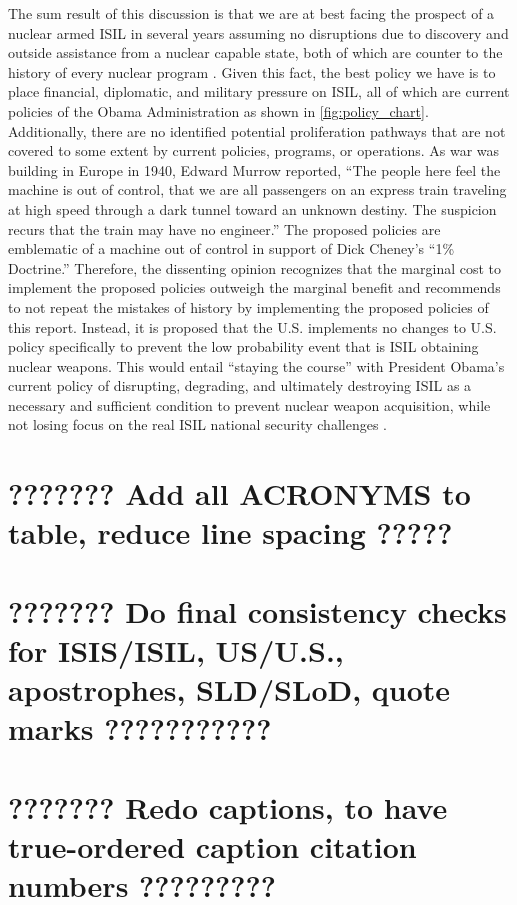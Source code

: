 \documentclass{report}
\begin{document}
The sum result of this discussion is that we are at best facing the prospect of a nuclear armed ISIL in several years assuming no disruptions due to discovery and outside assistance from a nuclear capable state, both of which are counter to the history of every nuclear program \cite{pollack2014unthinkable,Reed2010}.  Given this fact, the best policy we have is to place financial, diplomatic, and military pressure on ISIL, all of which are current policies of the Obama Administration as shown in \autoref{fig:policy_chart}.  Additionally, there are no identified potential proliferation pathways that are not covered to some extent by current policies, programs, or operations.  As war was building in Europe in 1940, Edward Murrow reported, \enquote{The people here feel the machine is out of control, that we are all passengers on an express train traveling at high speed through a dark tunnel toward an unknown destiny.  The suspicion recurs that the train may have no engineer.}  The proposed policies are emblematic of a machine out of control in support of Dick Cheney's \enquote{1\% Doctrine.} Therefore, the dissenting opinion recognizes that the marginal cost to implement the proposed policies outweigh the marginal benefit and recommends to not repeat the mistakes of history by implementing the proposed policies of this report. Instead, it is proposed that the U.S. implements no changes to U.S. policy specifically to prevent the low probability event that is ISIL obtaining nuclear weapons. This would entail \enquote{staying the course} with President Obama's current policy of disrupting, degrading, and ultimately destroying ISIL as a necessary and sufficient condition to prevent nuclear weapon acquisition, while not losing focus on the real ISIL national security challenges \cite{WhiteHouse2014}.


\chapter{???????  Add all ACRONYMS to table, reduce line spacing ?????}

\chapter{???????  Do final consistency checks for ISIS/ISIL, US/U.S., apostrophes, SLD/SLoD, quote marks  ???????????}



\chapter{???????  Redo captions, to have true-ordered caption citation numbers    ?????????}
\end{document}
